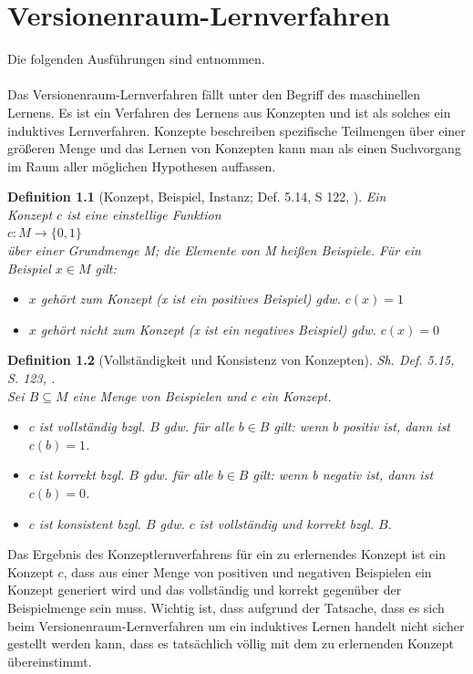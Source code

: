 \documentclass[a4paper, 11pt]{book}
\newtheorem{Def}{Definition }[section]
\begin{document}
{	\chapter{Versionenraum-Lernverfahren} \label{VRL} 
	Die folgenden Ausführungen sind \cite{BKI08} entnommen.\\
	\\
	 Das Versionenraum-Lernverfahren fällt unter den Begriff des maschinellen Lernens. Es ist ein Verfahren des Lernens aus Konzepten und ist als solches ein induktives Lernverfahren. Konzepte beschreiben spezifische Teilmengen über einer größeren Menge und das Lernen von Konzepten kann man als einen Suchvorgang im Raum aller möglichen Hypothesen auffassen. 
	\begin{Def}[Konzept, Beispiel, Instanz; Def. 5.14, S 122, \cite{BKI08}]
		Ein \\  Konzept $ c $ ist eine einstellige Funktion\\
		\hspace{2cm} $ c: M \rightarrow \{0,1\} $\\	
		über einer Grundmenge M; die Elemente von M heißen Beispiele. Für ein Beispiel $ x \in M $ gilt:\\
		\begin{itemize}
			\item $ x $ gehört zum Konzept (x ist ein positives Beispiel) gdw. $ c(x) = 1 $
			\item $ x $ gehört nicht zum Konzept (x ist ein negatives Beispiel) gdw. $ c(x) = 0 $
		\end{itemize}
	\end{Def}
\begin{Def}[Vollständigkeit und Konsistenz von Konzepten] 
	Sh.  Def. 5.15, S. 123, \cite{BKI08}.\\
	Sei $ B \subseteq M $ eine Menge von Beispielen und $ c $ ein Konzept.
	\begin{itemize}
		\item $ c $ ist vollständig bzgl. $ B $ gdw. für alle $ b \in B $ gilt: wenn $ b $ positiv ist, dann ist $ c(b) = 1 $.
		\item $ c $ ist korrekt bzgl. $ B $ gdw. für alle $ b \in B $ gilt: wenn b negativ ist, dann ist $ c(b) = 0 $.
		\item $ c $ ist konsistent bzgl. $ B $ gdw. $ c $ ist vollständig und korrekt bzgl. $ B $. 
	\end{itemize}
\end{Def}
Das Ergebnis des Konzeptlernverfahrens für ein zu erlernendes Konzept ist ein Konzept $ c $, dass aus einer Menge von positiven und negativen Beispielen ein Konzept generiert wird und das vollständig und korrekt gegenüber der Beispielmenge sein muss. Wichtig ist, dass aufgrund der Tatsache, dass es sich beim Versionenraum-Lernverfahren um ein induktives Lernen handelt nicht sicher gestellt werden kann, dass es tatsächlich völlig mit dem zu erlernenden Konzept übereinstimmt.
}
\end{document}
